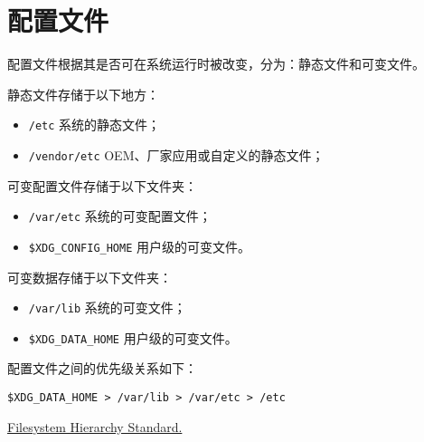 \documentclass{utart}
\begin{document}
\section{配置文件}
配置文件根据其是否可在系统运行时被改变，分为：静态文件和可变文件。

静态文件存储于以下地方：
\begin{itemize}[leftmargin=4em]
\item \texttt{/etc} 系统的静态文件；
\item \texttt{/vendor/etc} OEM、厂家应用或自定义的静态文件；
\end{itemize}

可变配置文件存储于以下文件夹：
\begin{itemize}[leftmargin=4em]
\item \texttt{/var/etc} 系统的可变配置文件；
\item \texttt{\$XDG\_CONFIG\_HOME} 用户级的可变文件。
\end{itemize}

可变数据存储于以下文件夹：
\begin{itemize}[leftmargin=4em]
\item \texttt{/var/lib} 系统的可变文件；
\item \texttt{\$XDG\_DATA\_HOME} 用户级的可变文件。
\end{itemize}

配置文件之间的优先级关系如下：

\texttt{\$XDG\_DATA\_HOME > /var/lib > /var/etc > /etc }

\begin{thebibliography}{99}
  \href{https://refspecs.linuxfoundation.org/FHS\_3.0/fhs/index.html}{Filesystem Hierarchy Standard.}
\end{thebibliography}
\end{document}
